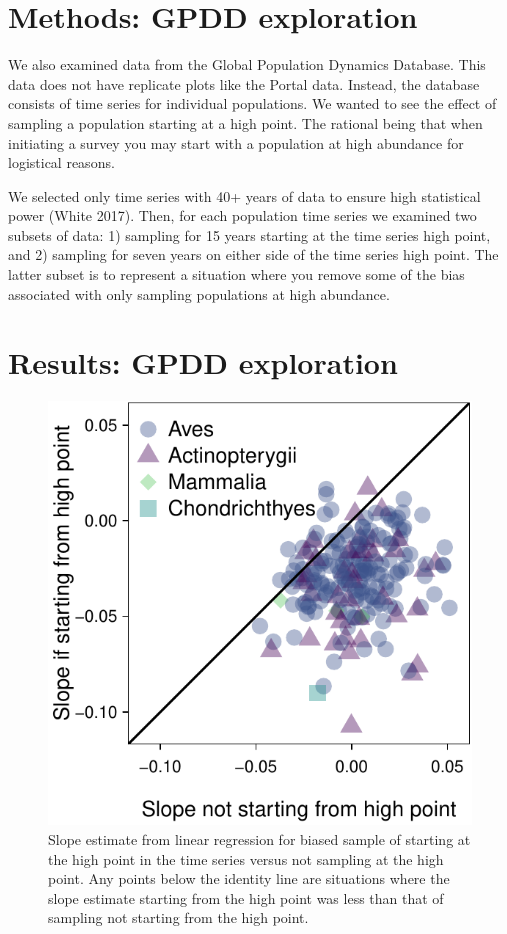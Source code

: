 \documentclass[]{article}
\begin{document}
\pagebreak

\section{Methods: GPDD exploration}

We also examined data from the Global Population Dynamics Database. This
data does not have replicate plots like the Portal data. Instead, the
database consists of time series for individual populations. We wanted
to see the effect of sampling a population starting at a high point. The
rational being that when initiating a survey you may start with a
population at high abundance for logistical reasons.

We selected only time series with 40+ years of data to ensure high
statistical power (White 2017). Then, for each population time series we
examined two subsets of data: 1) sampling for 15 years starting at the
time series high point, and 2) sampling for seven years on either side
of the time series high point. The latter subset is to represent a
situation where you remove some of the bias associated with only
sampling populations at high abundance.

\section{Results: GPDD exploration}

\begin{figure}[htbp]
\centering
\includegraphics{Empirical_Investigation_files/figure-latex/unnamed-chunk-5-1.pdf}
\caption{Slope estimate from linear regression for biased sample of
starting at the high point in the time series versus not sampling at the
high point. Any points below the identity line are situations where the
slope estimate starting from the high point was less than that of
sampling not starting from the high point.\label{fig:GPDD_high_point}}
\end{figure}
\end{document}
